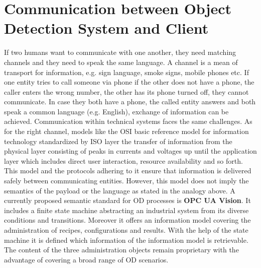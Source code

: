 \section{Communication between Object Detection System and Client}
If two humans want to communicate with one another, they need matching channels and they need to speak the same language. A channel is a mean of transport for information, e.g. sign language, smoke signs, mobile phones etc. If one entity tries to call someone via phone if the other does not have a phone, the caller enters the wrong number, the other has its phone turned off, they cannot communicate. In case they both have a phone, the called entity answers and both speak a common language (e.g. English), exchange of information can be achieved. Communication within technical systems faces the same challenges. As for the right channel, models like the OSI basic reference model for information technology standardized by ISO layer the transfer of information from the physical layer consisting of peaks in currents and voltages up until the application layer which includes direct user interaction, resource availability and so forth. \cite{InternationalOrganizationForStandardization1996ISO/IECEd.} This model and the protocols adhering to it ensure that information is delivered safely between communicating entities. However, this model does not imply the semantics of the payload or the language as stated in the analogy above. A currently proposed semantic standard for OD processes is \textbf{OPC UA Vision}. It includes a finite state machine abstracting an industrial system from its diverse conditions and transitions. Moreover it offers an information model covering the administration of recipes, configurations and results. With the help of the state machine it is defined which information of the information model is retrievable. The content of the three administration objects remain proprietary with the advantage of covering a broad range of OD scenarios.

